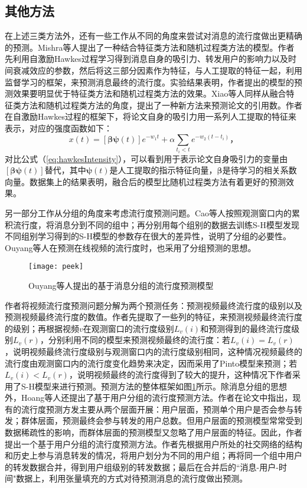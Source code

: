 \subsection{其他方法}
在上述三类方法外，还有一些工作从不同的角度来尝试对消息的流行度做出更精确的预测。Mishra等人\citep{mishra2016feature}提出了一种结合特征类方法和随机过程类方法的模型。作者先利用自激励Hawkes过程学习得到消息自身的吸引力、转发用户的影响力以及时间衰减效应的参数，然后将这三部分因素作为特征，与人工提取的特征一起，利用监督学习的框架，来预测消息最终的流行度。实验结果表明，作者提出的模型的预测效果要明显优于特征类方法和随机过程类方法的效果。Xiao等人\citep{xiao2016modeling}同样从融合特征类方法和随机过程类方法的角度，提出了一种新方法来预测论文的引用数。作者在自激励Hawkes过程的框架下，将论文自身的吸引力用一系列人工提取的特征来表示，对应的强度函数如下：
\begin{equation}
\label{eq:citationIntensity}
x(t)=[\boldsymbol{\beta} \boldsymbol{\psi}(t)]e^{-w_1 t}+\alpha \sum_{t_i<t}e^{-w_2(t-t_i)}\text{，}
\end{equation}
对比公式（\ref{eq:hawkesIntensity}），可以看到用于表示论文自身吸引力的变量由$[\boldsymbol{\beta} \boldsymbol{\psi}(t)]$替代，其中$\boldsymbol{\psi}(t)$是人工提取的指示特征向量，$\boldsymbol{\beta}$是待学习的相关系数向量。数据集上的结果表明，融合后的模型比随机过程类方法有着更好的预测效果。

另一部分工作从分组的角度来考虑流行度预测问题。Cao等人\citep{cao2017predicting}按照观测窗口内的累积流行度，将消息分到不同的组中；再分别用每个组别的数据去训练S-H模型发现不同组别学习得到的S-H模型的参数存在很大的差异性，说明了分组的必要性。Ouyang等人\citep{ouyang2016peek}在预测在线视频的流行度时，也采用了分组预测的思想。
\begin{figure}[!htbp]
  \centering
  \texttt{[image: peek]}
  \caption{Ouyang等人提出的基于消息分组的流行度预测模型\citep{ouyang2016peek}}
  \label{fig:group}
\end{figure}作者将视频流行度预测问题分解为两个预测任务：预测视频最终流行度的级别以及预测视频最终流行度的数值。作者先提取了一些列的特征，来预测视频最终流行度的级别；再根据视频$v$在观测窗口的流行度级别$L_v(i)$和预测得到的最终流行度级别$L_v(r)$，分别利用不同的模型来预测视频最终的流行度：若$L_v(i)=L_v(r)$，说明视频最终流行度级别与观测窗口内的流行度级别相同，这种情况视频最终的流行度由观测窗口内的流行度变化趋势来决定，因而采用了Pinto模型\citep{pinto2013using}来预测；若$L_v(i)<L_v(r)$，说明视频最终的流行度得到了较大的提升，这种情况下作者采用了S-H模型来进行预测。预测方法的整体框架如图\ref{fig:group}所示。除消息分组的思想外，Hoang等人\citep{hoang2017gpop}还提出了基于用户分组的流行度预测方法。作者在论文中指出，现有的流行度预测方发主要从两个层面开展：用户层面，预测单个用户是否会参与转发；群体层面，预测最终会参与转发的用户总数。但用户层面的预测模型常常受到数据稀疏性的影响，而群体层面的预测模型又忽略了用户层面的特征。因此，作者提出一个基于用户分组的流行度预测方法。作者先根据用户所处的社交网络的结构和历史上参与消息转发的情况，将用户划分为不同的用户组；再将同一个组中用户的转发数据合并，得到用户组级别的转发数据；最后在合并后的``消息-用户-时间"数据上，利用张量填充\citep{Kolda2009TDA}的方式对待预测消息的流行度做出预测。

